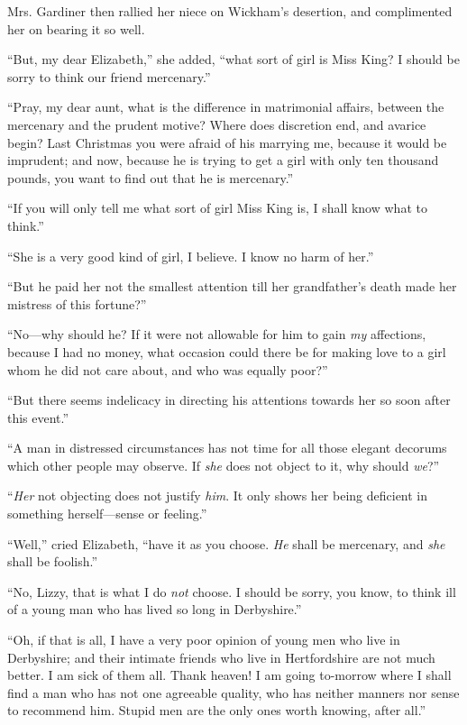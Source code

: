 Mrs. Gardiner then rallied her niece on Wickham's desertion, and complimented her on bearing it so well.

``But, my dear Elizabeth,'' she added, ``what sort of girl is Miss King? I should be sorry to think our friend mercenary.''

``Pray, my dear aunt, what is the difference in matrimonial affairs, between the mercenary and the prudent motive? Where does discretion end, and avarice begin? Last Christmas you were afraid of his marrying me, because it would be imprudent; and now, because he is trying to get a girl with only ten thousand pounds, you want to find out that he is mercenary.''

``If you will only tell me what sort of girl Miss King is, I shall know what to think.''

``She is a very good kind of girl, I believe. I know no harm of her.''

``But he paid her not the smallest attention till her grandfather's death made her mistress of this fortune?''

``No---why should he? If it were not allowable for him to gain \textit{my} affections, because I had no money, what occasion could there be for making love to a girl whom he did not care about, and who was equally poor?''

``But there seems indelicacy in directing his attentions towards her so soon after this event.''

``A man in distressed circumstances has not time for all those elegant decorums which other people may observe. If \textit{she} does not object to it, why should \textit{we}?''

``\textit{Her} not objecting does not justify \textit{him}. It only shows her being deficient in something herself---sense or feeling.''

``Well,'' cried Elizabeth, ``have it as you choose. \textit{He} shall be mercenary, and \textit{she} shall be foolish.''

``No, Lizzy, that is what I do \textit{not} choose. I should be sorry, you know, to think ill of a young man who has lived so long in Derbyshire.''

``Oh, if that is all, I have a very poor opinion of young men who live in Derbyshire; and their intimate friends who live in Hertfordshire are not much better. I am sick of them all. Thank heaven! I am going to-morrow where I shall find a man who has not one agreeable quality, who has neither manners nor sense to recommend him. Stupid men are the only ones worth knowing, after all.''

